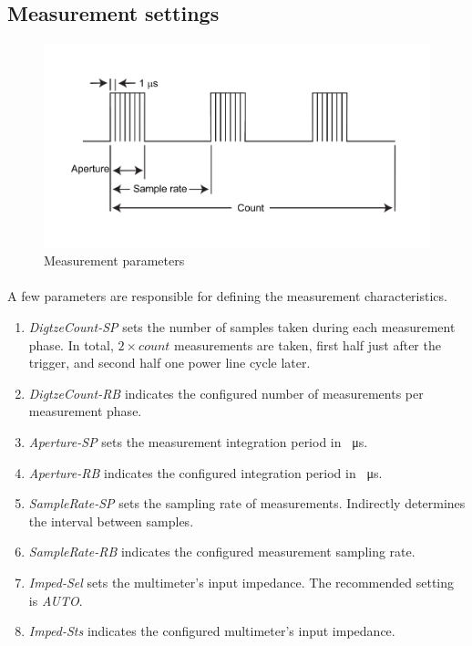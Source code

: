 \documentclass[openany]{article}
\begin{document}
	\subsection{Measurement settings}

		\begin{figure}[!h]
		\caption{Measurement parameters}
		\label{fig:meas-param}
		\centering
		\includegraphics[width=1.0\textwidth]{ict-meas-param-image}
		\end{figure}
\FloatBarrier

		\paragraph{} A few parameters are responsible for defining the measurement characteristics.

			\begin{enumerate}
			\item \emph{DigtzeCount-SP} sets the number of samples taken during each measurement phase. In total, $ 2\times count $ measurements are taken, first half just after the trigger, and second half one power line cycle later.
			\item \emph{DigtzeCount-RB} indicates the configured number of measurements per measurement phase.
			\item \emph{Aperture-SP} sets the measurement integration period in \SI{}{\micro\second}.
			\item \emph{Aperture-RB} indicates the configured integration period in \SI{}{\micro\second}.
			\item \emph{SampleRate-SP} sets the sampling rate of measurements. Indirectly determines the interval between samples.
			\item \emph{SampleRate-RB} indicates the configured measurement sampling rate.
			\item \emph{Imped-Sel} sets the multimeter's input impedance. The recommended setting is \emph{AUTO}.
			\item \emph{Imped-Sts} indicates the configured multimeter's input impedance.
			\end{enumerate}
\end{document}
